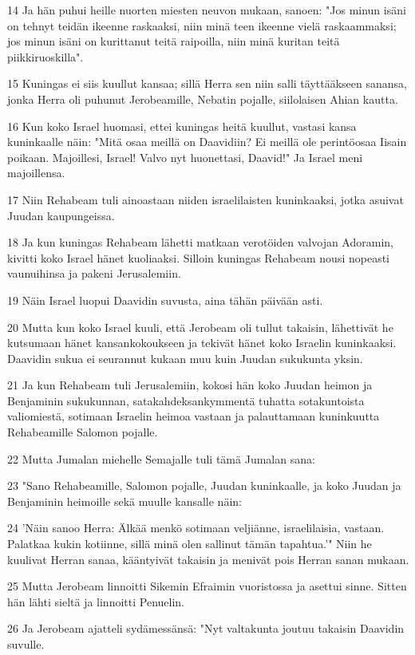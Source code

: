 \par 14 Ja hän puhui heille nuorten miesten neuvon mukaan, sanoen: "Jos minun isäni on tehnyt teidän ikeenne raskaaksi, niin minä teen ikeenne vielä raskaammaksi; jos minun isäni on kurittanut teitä raipoilla, niin minä kuritan teitä piikkiruoskilla".
\par 15 Kuningas ei siis kuullut kansaa; sillä Herra sen niin salli täyttääkseen sanansa, jonka Herra oli puhunut Jerobeamille, Nebatin pojalle, siilolaisen Ahian kautta.
\par 16 Kun koko Israel huomasi, ettei kuningas heitä kuullut, vastasi kansa kuninkaalle näin: "Mitä osaa meillä on Daavidiin? Ei meillä ole perintöosaa Iisain poikaan. Majoillesi, Israel! Valvo nyt huonettasi, Daavid!" Ja Israel meni majoillensa.
\par 17 Niin Rehabeam tuli ainoastaan niiden israelilaisten kuninkaaksi, jotka asuivat Juudan kaupungeissa.
\par 18 Ja kun kuningas Rehabeam lähetti matkaan verotöiden valvojan Adoramin, kivitti koko Israel hänet kuoliaaksi. Silloin kuningas Rehabeam nousi nopeasti vaunuihinsa ja pakeni Jerusalemiin.
\par 19 Näin Israel luopui Daavidin suvusta, aina tähän päivään asti.
\par 20 Mutta kun koko Israel kuuli, että Jerobeam oli tullut takaisin, lähettivät he kutsumaan hänet kansankokoukseen ja tekivät hänet koko Israelin kuninkaaksi. Daavidin sukua ei seurannut kukaan muu kuin Juudan sukukunta yksin.
\par 21 Ja kun Rehabeam tuli Jerusalemiin, kokosi hän koko Juudan heimon ja Benjaminin sukukunnan, satakahdeksankymmentä tuhatta sotakuntoista valiomiestä, sotimaan Israelin heimoa vastaan ja palauttamaan kuninkuutta Rehabeamille Salomon pojalle.
\par 22 Mutta Jumalan miehelle Semajalle tuli tämä Jumalan sana:
\par 23 "Sano Rehabeamille, Salomon pojalle, Juudan kuninkaalle, ja koko Juudan ja Benjaminin heimoille sekä muulle kansalle näin:
\par 24 'Näin sanoo Herra: Älkää menkö sotimaan veljiänne, israelilaisia, vastaan. Palatkaa kukin kotiinne, sillä minä olen sallinut tämän tapahtua.'" Niin he kuulivat Herran sanaa, kääntyivät takaisin ja menivät pois Herran sanan mukaan.
\par 25 Mutta Jerobeam linnoitti Sikemin Efraimin vuoristossa ja asettui sinne. Sitten hän lähti sieltä ja linnoitti Penuelin.
\par 26 Ja Jerobeam ajatteli sydämessänsä: "Nyt valtakunta joutuu takaisin Daavidin suvulle.
